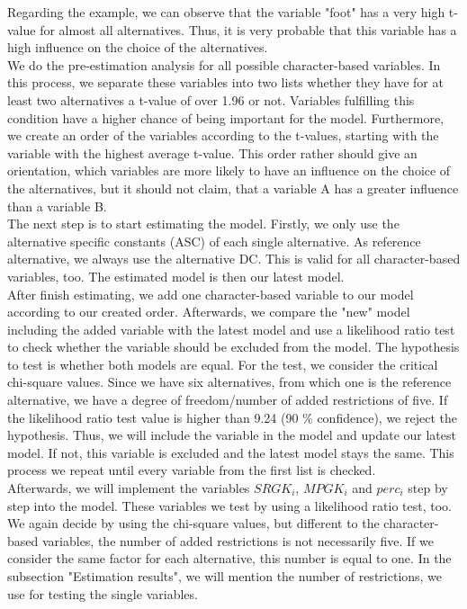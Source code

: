 \documentclass[12pt,dvipsnames]{article}%
\begin{document}
 
Regarding the example, we can observe that the variable "foot" has a very high t-value for almost all alternatives. Thus, it is very probable that this variable has a high influence on the choice of the alternatives. \\ 
We do the pre-estimation analysis for all possible character-based variables. In this process, we separate these variables into two lists whether they have for at least two alternatives a t-value of over 1.96 or not. Variables fulfilling this condition have a higher chance of being important for the model. Furthermore, we create an order of the variables according to the t-values, starting with the variable with the highest average t-value. This order rather should give an orientation, which variables are more likely to have an influence on the choice of the alternatives, but it should not claim, that a variable A has a greater influence than a variable B.  \\
The next step is to start estimating the model. Firstly, we only use the alternative specific constants (ASC) of each single alternative. As reference alternative, we always use the alternative DC. This is valid for all character-based variables, too. The estimated model is then our latest model. \\
After finish estimating, we add one character-based variable to our model according to our created order. Afterwards, we compare the "new" model including the added variable with the latest model and use a likelihood ratio test to check whether the variable should be excluded from the model. The hypothesis to test is whether both models are equal. For the test, we consider the critical chi-square values. Since we have six alternatives, from which one is the reference alternative, we have a degree of freedom/number of added restrictions of five. If the likelihood ratio test value is higher than 9.24 (90 \% confidence), we reject the hypothesis. Thus, we will include the variable in the model and update our latest model. If not, this variable is excluded and the latest model stays the same. This process we repeat until every variable from the first list is checked.\\
Afterwards, we will implement the variables $SRGK_i$, $MPGK_i$ and $perc_i$ step by step into the model. These variables we test by using a likelihood ratio test, too. We again decide by using the chi-square values, but different to the character-based variables, the number of added restrictions is not necessarily five. If we consider the same factor for each alternative, this number is equal to one. In the subsection "Estimation results", we will mention the number of restrictions, we use for testing the single variables. \\
\end{document}
